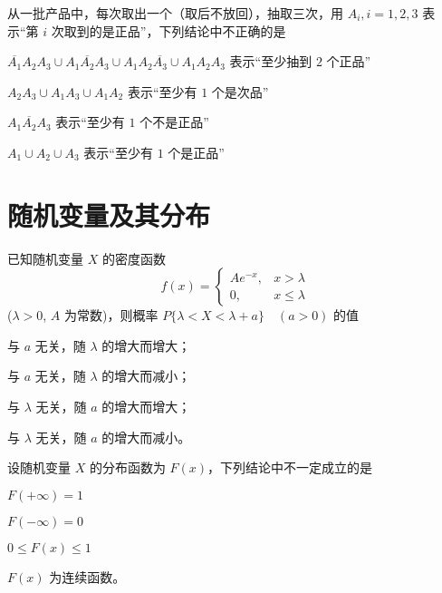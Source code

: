 \documentclass{exam-zh}
\begin{document}
\begin{question}
  从一批产品中，每次取出一个（取后不放回），抽取三次，用 $A_i, i=1,2,3$ 表示“第 $i$ 次取到的是正品”，下列结论中不正确的是 \paren[B]
  \begin{choices}
    \item $\overline{A_1} A_2 A_3 \cup A_1 \overline{A_2} A_3 \cup A_1 A_2 \overline{A_3} \cup A_1 A_2 A_3$ 表示“至少抽到 $2$ 个正品”  
    \item $A_2 A_3 \cup A_1 A_3 \cup A_1 A_2$ 表示“至少有 $1$ 个是次品”
    \item $\overline{A_1A_2A_3}$ 表示“至少有 $1$ 个不是正品”
    \item $A_1 \cup A_2 \cup A_3$ 表示“至少有 $1$ 个是正品”
  \end{choices}
\end{question}

\section{随机变量及其分布}

\begin{question}
  已知随机变量 $X$ 的密度函数  
  $$f(x) = 
  \begin{cases} 
  Ae^{-x}, & x > \lambda \\ 
  0, & x \leq \lambda 
  \end{cases}$$  
  ($\lambda > 0$, $A$ 为常数)，则概率  
  $P\{\lambda < X < \lambda + a\} \quad (a > 0)$  
  的值 \paren[C]
  \begin{choices}
    \item 与 $a$ 无关，随 $\lambda$ 的增大而增大；  
    \item 与 $a$ 无关，随 $\lambda$ 的增大而减小；  
    \item 与 $\lambda$ 无关，随 $a$ 的增大而增大；  
    \item 与 $\lambda$ 无关，随 $a$ 的增大而减小。  
  \end{choices}
\end{question}

\begin{question}
  设随机变量 $X$ 的分布函数为 $F(x)$，下列结论中不一定成立的是 \paren[D]
  \begin{choices}
    \item $F(+\infty) = 1$  
    \item $F(-\infty) = 0$  
    \item $0 \leq F(x) \leq 1$  
    \item $F(x)$ 为连续函数。  
  \end{choices}
\end{question}
\end{document}
